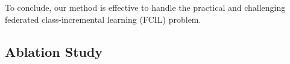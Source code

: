 \documentclass[sigconf,anonymous,review,screen]{acmart}
\begin{document}
To conclude, our method is effective to handle the practical and challenging federated class-incremental learning (FCIL) problem.


%
%
%
%
%

\subsection{Ablation Study}
\end{document}
